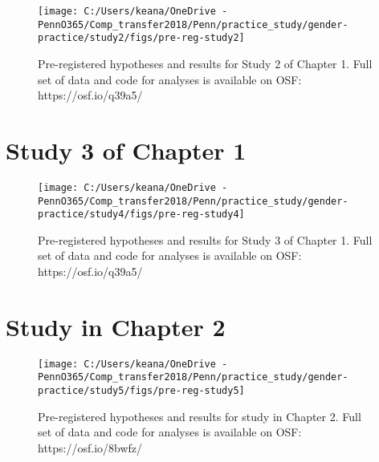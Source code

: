 \documentclass[letterpaper, nobind]{templates/ociamthesis}
\newcommand*{\bibtitle}{Bibliography}
\begin{document}
\begin{figure}
\texttt{[image: C:/Users/keana/OneDrive - PennO365/Comp\_transfer2018/Penn/practice\_study/gender-practice/study2/figs/pre-reg-study2]} \caption{Pre-registered hypotheses and results for Study 2 of Chapter 1. Full set of data and code for analyses is available on OSF: https://osf.io/q39a5/}\label{fig:pre-reg-study2}
\end{figure}

\hypertarget{study-3-of-chapter-1}{%
\section{Study 3 of Chapter 1}\label{study-3-of-chapter-1}}

\begin{figure}
\texttt{[image: C:/Users/keana/OneDrive - PennO365/Comp\_transfer2018/Penn/practice\_study/gender-practice/study4/figs/pre-reg-study4]} \caption{Pre-registered hypotheses and results for Study 3 of Chapter 1. Full set of data and code for analyses is available on OSF: https://osf.io/q39a5/}\label{fig:pre-reg-study4}
\end{figure}

\hypertarget{study-in-chapter-2}{%
\section{Study in Chapter 2}\label{study-in-chapter-2}}

\begin{figure}
\texttt{[image: C:/Users/keana/OneDrive - PennO365/Comp\_transfer2018/Penn/practice\_study/gender-practice/study5/figs/pre-reg-study5]} \caption{Pre-registered hypotheses and results for study in Chapter 2. Full set of data and code for analyses is available on OSF: https://osf.io/8bwfz/}\label{fig:pre-reg-study5}
\end{figure}


\setlength{\baselineskip}{0pt} %

{\renewcommand*\MakeUppercase[1]{#1}%
\printbibliography[heading=bibintoc,title={\bibtitle}]}
\end{document}

